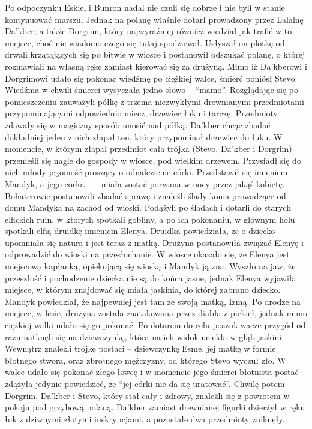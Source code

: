 \begin{twocolumn}
Po odpoczynku Eskiel i Bunron nadal nie czuli się dobrze i nie byli w stanie kontynuować marszu. Jednak na polanę właśnie dotarł prowadzony przez Lalalnę Da’kber, a także Dorgrim, który najwyraźniej również wiedział jak trafić w to miejsce, choć nie wiadomo czego się tutaj spodziewał.
Usłyszał on plotkę od drwali krzątających się po bitwie w wiosce i postanowił odszukać polanę, o której rozmawiali na własną rękę zamiast kierować się za drużyną.
Mimo iż Da’kberowi i Dorgrimowi udało się pokonać wiedźmę po ciężkiej walce, śmierć poniósł Stevo. Wiedźma w chwili śmierci wysyczała jedno słowo – “mamo”.
Rozglądając się po pomieszczeniu zauważyli półkę z trzema niezwykłymi drewnianymi przedmiotami przypominającymi odpowiednio miecz, drzewiec łuku i tarczę. Przedmioty zdawały się w magiczny sposób unosić nad półką. Da’kber chcąc zbadać dokładniej jeden z nich złapał ten, który przypominał drzewiec do łuku.
W momencie, w którym złapał przedmiot cała trójka (Stevo, Da’kber i Dorgrim) przenieśli się nagle do gospody w wiosce, pod wielkim drzewem. Przysiadł się do nich młody jegomość proszący o odnalezienie córki. Przedstawił się imieniem Mandyk, a jego córka – 	 – miała zostać porwana w nocy przez jakąś kobietę.
Bohaterowie postanowili zbadać sprawę i znaleźli ślady konia prowadzące od domu Mandyka na zachód od wioski.
Podążyli po śladach i dotarli do starych elfickich ruin, w których spotkali gobliny, a po ich pokonaniu, w głównym holu spotkali elfią druidkę imieniem Elenya.
Druidka powiedziała, że o dziecko upomniała się natura i jest teraz z matką. Drużyna postanowiła związać Elenyę i odprowadzić do wioski na przesłuchanie.
W wiosce okazało się, że Elenya jest miejscową kapłanką, opiekującą się wioską i Mandyk ją zna. Wyszło na jaw, że przeszłość i pochodzenie dziecka nie są do końca jasne, jednak Elenya wyjawiła miejsce, w którym znajdować się miała jaskinia, do której zabrano dziecko.
Mandyk powiedział, że najpewniej jest tam ze swoją matką, Izmą.
Po drodze na miejsce, w lesie, drużyna została zaatakowana przez diabła z piekieł, jednak mimo ciężkiej walki udało się go pokonać.
Po dotarciu do celu poszukiwacze przygód od razu natknęli się na dziewczynkę, która na ich widok uciekła w głąb jaskini.
Wewnątrz znaleźli trójkę postaci – dziewczynkę Esme, jej matkę w formie błotnego stwora, oraz zbrojnego mężczyzny, od którego Stevo wyczuł zło.
W walce udało się pokonać złego łowcę i w momencie jego śmierci błotnista postać zdążyła jedynie powiedzieć, że “jej córki nie da się uratować”. Chwilę potem Dorgrim, Da’kber i Stevo, który stał cały i zdrowy, znaleźli się z powrotem w pokoju pod grzybową polaną. Da’kber zamiast drewnianej figurki dzierżył w ręku łuk z dziwnymi złotymi inskrypcjami, a pozostałe dwa przedmioty zniknęły.





\end{twocolumn}
